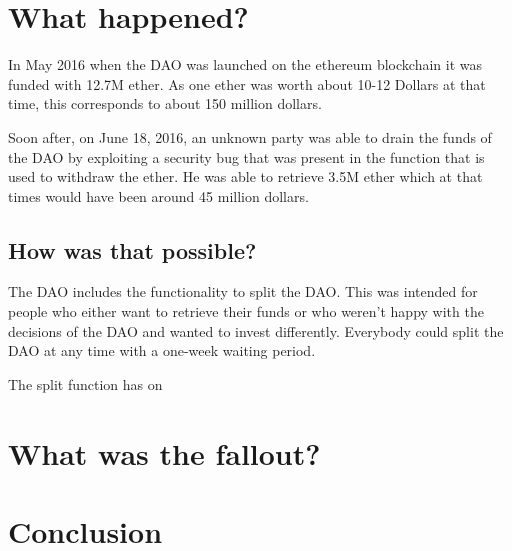\documentclass[a4paper, 11pt]{scrartcl}
\begin{document}
\section{What happened?}

In May 2016 when the DAO was launched on the ethereum blockchain it was funded with 12.7M ether.
As one ether was worth about 10-12 Dollars at that time, this corresponds to about 150 million dollars.

Soon after, on June 18, 2016, an unknown party was able to drain the funds of the DAO by exploiting a security bug that was present in the function that is used to withdraw the ether.
He was able to retrieve 3.5M ether which at that times would have been around 45 million dollars.

\subsection{How was that possible?}

The DAO includes the functionality to split the DAO.
This was intended for people who either want to retrieve their funds or who weren't happy with the decisions of the DAO and wanted to invest differently.
Everybody could split the DAO at any time with a one-week waiting period.

The split function has on

\section{What was the fallout?}

\section{Conclusion}

\nocite{*}
\clearpage
\printbibliography[heading=bibintoc]
\end{document}
